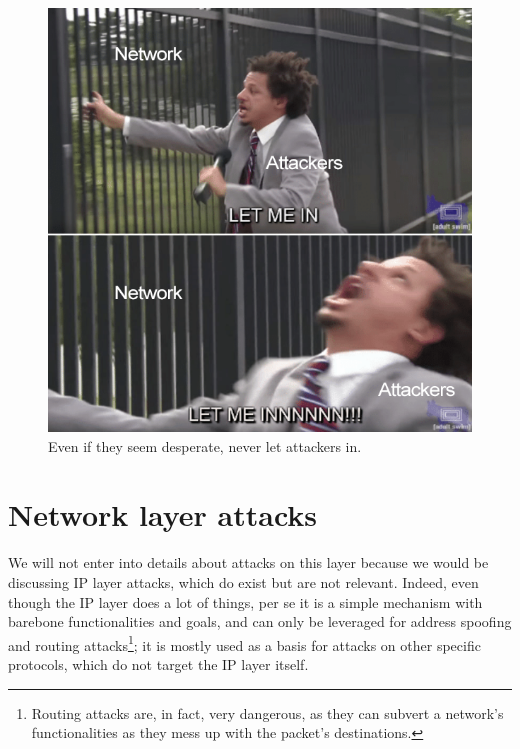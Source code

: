 \begin{enumerate}
\begin{figure}[h]
    \centering
    \includegraphics[scale=1]{img/meme_let_me_in_arp.png}
    \decoRule
    \caption{Even if they seem desperate, never let attackers in.}
    \label{fig:meme_let_me_in_arp}
\end{figure}

\end{enumerate}


\section{Network layer attacks}
We will not enter into details about attacks on this layer because we would be discussing IP layer attacks, which do exist but are not relevant. Indeed, even though the IP layer does a lot of things, per se it is a simple mechanism with barebone functionalities and goals, and can only be leveraged for address spoofing and routing attacks\footnote{Routing attacks are, in fact, very dangerous, as they can subvert a network’s functionalities as they mess up with the packet’s destinations.}; it is mostly used as a basis for attacks on other specific protocols, which do not target the IP layer itself.

